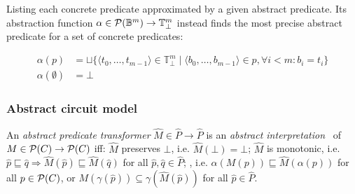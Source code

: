 \noindent Listing each concrete predicate approximated by a given abstract predicate. Its abstraction function $\alpha \in \mathcal{P}(\mathbb{B}^{m}) \rightarrow \mathbb{T}_{\bot}^{m}$ instead finds the most precise abstract predicate for a set of concrete predicates:

\begin{align*}
\alpha ( p ) &= \sqcup \{ \langle t_{0}, \ldots, t_{m-1} \rangle \in \mathbb{T}_{\bot}^{m} \mid \langle b_{0}, \ldots, b_{m-1} \rangle \in p, \forall i < m : b_{i} = t_{i} \} \\
\alpha ( \emptyset ) &= \bot
\end{align*}



\subsubsection{Abstract circuit model}

An \textit{abstract predicate transformer} $\hat M \in \hat P \rightarrow \hat P$ is an \textit{abstract interpretation}~\cite{cousot1996} of $M \in \mathcal{P}(C) \rightarrow \mathcal{P}(C)$ iff: $\hat M$ preserves $\bot$, i.e. $\hat M(\bot) = \bot$; $\hat M$ is monotonic, i.e. $\hat p \sqsubseteq \hat q \Rightarrow \hat M (\hat p) \sqsubseteq \hat M (\hat q)$ for all $\hat p, \hat q \in \hat P$; , i.e. $\alpha(M(p)) \sqsubseteq \hat M(\alpha(p))$ for all $p \in \mathcal{P}(C)$, or $M(\gamma(\hat p)) \subseteq \gamma(\hat M(\hat p))$ for all $\hat p \in \hat P$.



